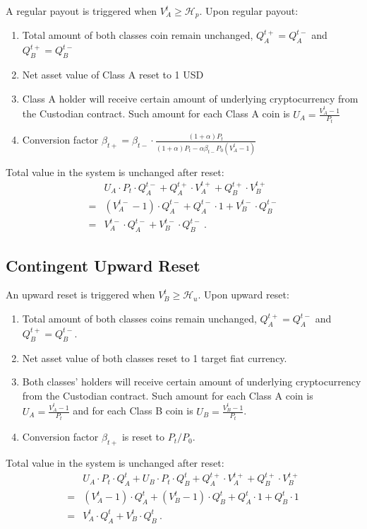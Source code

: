 \documentclass[draft, noinfoline]{ectaart}
\numberwithin{equation}{section}
\theoremstyle{plain}
\begin{document}
\begin{appendices}
A regular payout is triggered when $V_{A}^{t}\geqslant\mathcal{H}_{p}$. Upon regular payout:
\begin{enumerate}
\item Total amount of both classes coin remain unchanged, $Q_{A}^{t+}=Q_{A}^{t-}$ and $Q_{B}^{t+}=Q_{B}^{t-}$
\item Net asset value of Class A reset to 1 USD
\item Class A holder will receive certain amount of underlying cryptocurrency from the Custodian contract. Such amount for each Class A coin is $U_{A}=\frac{V_{A}^{t}-1}{P_{t}}$
\item Conversion factor $\beta_{t+}=\beta_{t-}\cdot\frac{\left(1+\alpha\right) P_{t}}{\left(1+\alpha\right) P_{t}-\alpha\beta_{t-} P_{0}\left(V_{A}^{t}-1\right)}$
\end{enumerate}
Total value in the system is unchanged after reset:
\begin{align*}
 & U_{A}\cdot P_{t}\cdot Q_{A}^{t-}+Q_{A}^{t+}\cdot V_{A}^{t+}+Q_{B}^{t+}\cdot V_{B}^{t+}\\
= & \left(V_{A}^{t-}-1\right)\cdot Q_{A}^{t-}+Q_{A}^{t-}\cdot1+V_{B}^{t-}\cdot Q_{B}^{t-}\\
= & V_{A}^{t-}\cdot Q_{A}^{t-}+V_{B}^{t-}\cdot Q_{B}^{t-}\ .
\end{align*}



\subsection{Contingent Upward Reset\label{subsec:Contingent-Upward-Reset}}

An upward reset is triggered when $V_{B}^{t}\geqslant\mathcal{H}_{u}$. Upon upward reset:
\begin{enumerate}
\item Total amount of both classes coins remain unchanged, $Q_{A}^{t+}=Q_{A}^{t-}$ and $Q_{B}^{t+}=Q_{B}^{t-}$.
\item Net asset value of both classes reset to 1 target fiat currency.
\item Both classes' holders will receive certain amount of underlying cryptocurrency from the Custodian contract. Such amount for each Class A coin is $U_{A}=\frac{V_{A}^{t}-1}{P_{t}}$ and for each Class B coin is $U_{B}=\frac{V_{B}^{t}-1}{P_{t}}$.
\item Conversion factor $\beta_{t+}$ is reset to $P_t/P_0$.
\end{enumerate}
Total value in the system is unchanged after reset:
\begin{align*}
 & U_{A}\cdot P_{t}\cdot Q_{A}^{t}+U_{B}\cdot P_{t}\cdot Q_{B}^{t}+Q_{A}^{t+}\cdot V_{A}^{t+}+Q_{B}^{t+}\cdot V_{B}^{t+}\\
= & \left(V_{A}^{t}-1\right)\cdot Q_{A}^{t}+\left(V_{B}^{t}-1\right)\cdot Q_{B}^{t}+Q_{A}^{t}\cdot1+Q_{B}^{t}\cdot1\\
= & V_{A}^{t}\cdot Q_{A}^{t}+V_{B}^{t}\cdot Q_{B}^{t}\ .
\end{align*}


\end{appendices}
\end{document}
